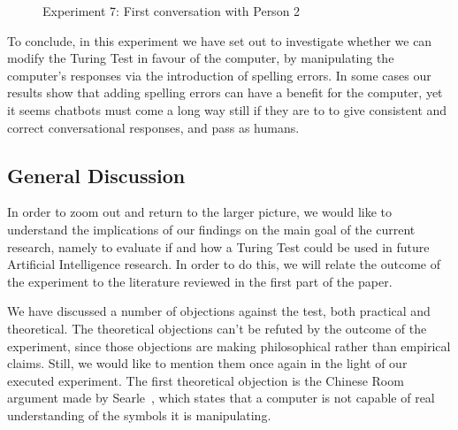 \begin{figure}[ht]
   \begin{center}
   \end{center}
   \caption{Experiment 7: First conversation with Person 2}
   \label{convex5}
\end{figure}

To conclude, in this experiment we have set out to investigate whether we can modify the Turing Test in favour of the computer, by manipulating the computer's responses via the introduction of spelling errors. In some cases our results show that adding spelling errors can have a benefit for the computer, yet it seems chatbots must come a long way still if they are to to give consistent and correct conversational responses, and pass as humans.


\subsection{General Discussion}
In order to zoom out and return to the larger picture, we would like to understand the implications of our findings on the main goal of the current research, namely to evaluate if and how a Turing Test could be used in future Artificial Intelligence research. In order to do this, we will relate the outcome of the experiment to the literature reviewed in the first part of the paper.

We have discussed a number of objections against the test, both practical and theoretical. The theoretical objections can't be refuted by the outcome of the experiment, since those objections are making philosophical rather than empirical claims. Still, we would like to mention them once again in the light of our executed experiment. The first theoretical objection is the Chinese Room argument made by Searle~\cite{searle1980minds}, which states that a computer is not capable of real understanding of the symbols it is manipulating.


